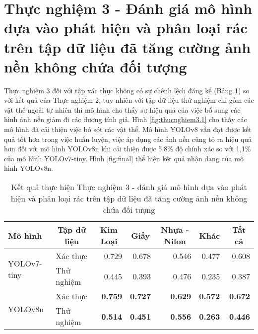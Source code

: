 \documentclass[../the.tex]{subfiles}
\begin{document}
\section{Thực nghiệm 3 - Đánh giá mô hình dựa vào phát hiện và phân loại rác trên tập dữ liệu đã tăng cường ảnh nền không chứa đối tượng} 
{\fontsize{13}{12} \selectfont

Thực nghiệm 3 đối với tập xác thực không có sự chênh lệch đáng kể (Bảng \ref{tab:thucnghiem3.1}) so với kết quả của Thực nghiệm 2, tuy nhiên với tập dữ liệu thử nghiệm chỉ gồm các vật thể ngoài tự nhiên thì mô hình
cho thấy sự hiệu quả của việc bổ sung các hình ảnh nền giảm đi các dương tính giả. Hình \ref{fig:thucnghiem3.1} cho thấy các mô hình đã cải thiện việc bỏ sót các vật thể.
Mô hình YOLOv8 vẫn đạt được kết quả tốt hơn trong việc huấn luyện, việc áp dụng các ảnh nền cũng tỏ ra hiệu quả hơn đối với mô hình YOLOv8n khi cải thiện được 5.8\% độ chính xác so với 1,1\% của mô hình YOLOv7-tiny.
Hình \ref{fig:final} thể hiện kết quả nhận dạng của mô hình YOLOv8n.

}

\begin{table}[h!]
    \centering
    \caption{Kết quả thực hiện Thực nghiệm 3 - đánh giá mô hình dựa vào phát hiện và phân loại rác trên tập dữ liệu đã tăng cường ảnh nền không chứa đối tượng}
    \begin{tabular}{|l|l|r|r|r|r|r|}
        \hline
        \textbf{Mô hình}             & \multicolumn{1}{c|}{\textbf{Tập dữ liệu}} & \multicolumn{1}{c|}{\textbf{Kim Loại}} & \multicolumn{1}{c|}{\textbf{Giấy}} & \multicolumn{1}{c|}{\textbf{Nhựa - Nilon}} & \multicolumn{1}{c|}{\textbf{Khác}} & \multicolumn{1}{c|}{\textbf{Tất cả}} \\ \hline
        \multirow{2}{*}{YOLOv7-tiny} & Xác thực                                  & 0.729                                  & 0.678                              & 0.546                                      & 0.477                              & 0.608                                \\ \cline{2-7}
                                     & Thử nghiệm                                & 0.445                                  & 0.393                              & 0.476                                      & 0.235                              & 0.387                                \\ \hline
        \multirow{2}{*}{YOLOv8n}     & Xác thực                                  & \textbf{0.759}                         & \textbf{0.727}                     & \textbf{0.629}                             & \textbf{0.572}                     & \textbf{0.672}                       \\ \cline{2-7}
                                     & Thử nghiệm                                & \textbf{0.514}                         & \textbf{0.451}                     & \textbf{0.556}                             & \textbf{0.263}                     & \textbf{0.446}                       \\ \hline
    \end{tabular}
    \label{tab:thucnghiem3.1}
\end{table}
\end{document}
